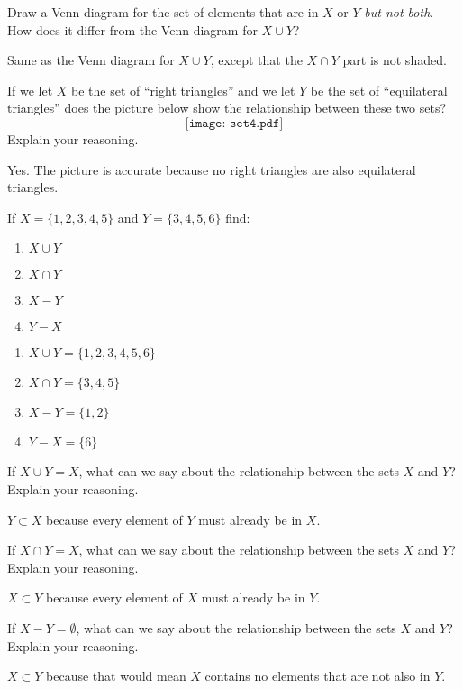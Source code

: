 \documentclass{ximera}
\begin{document}
\begin{problem}
Draw a Venn diagram for the set of elements that are in $X$ or $Y$ \emph{but not both}. 
How does it differ from the Venn diagram for $X\cup Y$?  
\begin{freeResponse}
Same as the Venn diagram for $X\cup Y$, except that the $X\cap Y$ part is not shaded.  
\end{freeResponse}
\end{problem}

\begin{problem}
If we let $X$ be the set of ``right triangles'' and we let $Y$ be the set of ``equilateral triangles'' does the picture below show the relationship between these two sets?
\[
\texttt{[image: set4.pdf]}
\]
Explain your reasoning.
\begin{freeResponse}
Yes.  The picture is accurate because no right triangles are also equilateral triangles.  
\end{freeResponse}
\end{problem}

\begin{problem}
If $X = \{1,2,3,4,5\}$ and $Y = \{3,4,5,6\}$ find:
\begin{enumerate}
\item $X\cup Y$
\item $X\cap Y$
\item $X-Y$
\item $Y-X$
\end{enumerate}
\begin{freeResponse}
\begin{enumerate}
\item $X\cup Y = \{1,2,3,4,5,6\}$
\item $X\cap Y = \{3,4,5\}$
\item $X-Y = \{1,2\}$
\item $Y-X = \{6\}$
\end{enumerate}
\end{freeResponse}
\end{problem}

\begin{problem}
If $X\cup Y = X$, what can we say about the relationship between the sets $X$ and $Y$? Explain your reasoning.
\begin{freeResponse}
$Y\subset X$ because every element of $Y$ must already be in $X$.  
\end{freeResponse}
\end{problem}

\begin{problem}
If $X\cap Y = X$, what can we say about the relationship between the sets $X$ and $Y$? Explain your reasoning.
\begin{freeResponse}
$X\subset Y$ because every element of $X$ must already be in $Y$.  
\end{freeResponse}
\end{problem}

\begin{problem}
If $X-Y =\emptyset$, what can we say about the relationship between the sets $X$ and $Y$? Explain your reasoning.
\begin{freeResponse}
$X\subset Y$ because that would mean $X$ contains no elements that are not also in $Y$.  
\end{freeResponse}
\end{problem}
\end{document}
